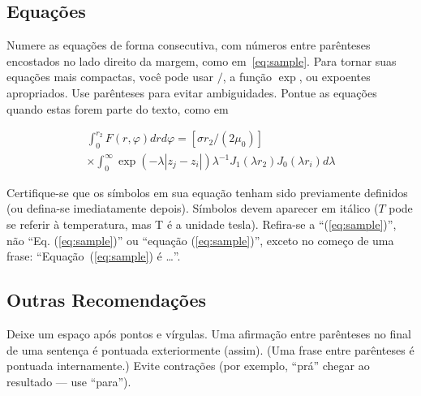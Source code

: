 \documentclass[a4paper]{ifacconf}
\begin{document}
\subsection{Equações}

Numere as equações de forma consecutiva, com números entre parênteses
encostados no lado direito da
margem, como em~\eqref{eq:sample}. Para tornar suas equações mais compactas,
você pode usar $/$, a função $\exp$, ou expoentes apropriados. Use parênteses para
evitar ambiguidades. Pontue as equações quando estas forem parte do texto, como em

\begin{multline} 
\int_0^{r_2}  F (r, \varphi ) dr d\varphi =  [\sigma r_2 / (2 \mu_0 )] \\
\times   \int_0^{\infty} \exp(-\lambda |z_j - z_i |) \lambda^{-1} J_1 (\lambda  r_2 ) J_0 (\lambda r_i ) d\lambda 
\label{eq:sample2}
\end{multline}

Certifique-se que os símbolos em sua equação tenham sido previamente definidos (ou defina-se imediatamente depois). Símbolos devem aparecer em itálico ($T$ pode
se referir à temperatura, mas T é a unidade tesla). 
Refira-se a ``(\ref{eq:sample})'', não ``Eq. (\ref{eq:sample})'' ou ``equação
(\ref{eq:sample})'', exceto no começo de uma frase: ``Equação~(\ref{eq:sample}) é \ldots''. 

\subsection{Outras Recomendações}

Deixe um espaço após pontos e vírgulas. 
Uma afirmação entre parênteses no final de uma sentença é pontuada exteriormente
(assim). (Uma frase entre parênteses é pontuada internamente.) Evite contrações
(por exemplo, ``prá'' chegar ao resultado --- use ``para''). 
\end{document}
